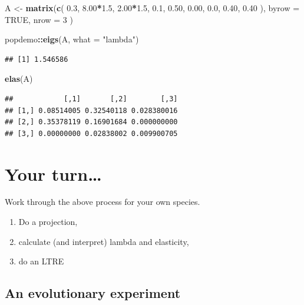 \documentclass[
  a4paper]{book}
\newenvironment{Shaded}{\begin{snugshade}}{\end{snugshade}}
\newcommand{\AttributeTok}[1]{\textcolor[rgb]{0.13,0.29,0.53}{#1}}
\newcommand{\ConstantTok}[1]{\textcolor[rgb]{0.56,0.35,0.01}{#1}}
\newcommand{\DecValTok}[1]{\textcolor[rgb]{0.00,0.00,0.81}{#1}}
\newcommand{\FloatTok}[1]{\textcolor[rgb]{0.00,0.00,0.81}{#1}}
\newcommand{\FunctionTok}[1]{\textcolor[rgb]{0.13,0.29,0.53}{\textbf{#1}}}
\newcommand{\NormalTok}[1]{#1}
\newcommand{\OtherTok}[1]{\textcolor[rgb]{0.56,0.35,0.01}{#1}}
\newcommand{\SpecialCharTok}[1]{\textcolor[rgb]{0.81,0.36,0.00}{\textbf{#1}}}
\newcommand{\StringTok}[1]{\textcolor[rgb]{0.31,0.60,0.02}{#1}}
\providecommand{\tightlist}{%
  \setlength{\itemsep}{0pt}\setlength{\parskip}{0pt}}
\begin{document}
\begin{Shaded}
\begin{Highlighting}[]
\NormalTok{A }\OtherTok{\textless{}{-}} \FunctionTok{matrix}\NormalTok{(}\FunctionTok{c}\NormalTok{(}
  \FloatTok{0.3}\NormalTok{, }\FloatTok{8.00}\SpecialCharTok{*}\FloatTok{1.5}\NormalTok{, }\FloatTok{2.00}\SpecialCharTok{*}\FloatTok{1.5}\NormalTok{,}
  \FloatTok{0.1}\NormalTok{, }\FloatTok{0.50}\NormalTok{, }\FloatTok{0.00}\NormalTok{,}
  \FloatTok{0.0}\NormalTok{, }\FloatTok{0.40}\NormalTok{, }\FloatTok{0.40}
\NormalTok{),}
\AttributeTok{byrow =} \ConstantTok{TRUE}\NormalTok{, }\AttributeTok{nrow =} \DecValTok{3}
\NormalTok{)}

\NormalTok{popdemo}\SpecialCharTok{::}\FunctionTok{eigs}\NormalTok{(A, }\AttributeTok{what =} \StringTok{"lambda"}\NormalTok{)}
\end{Highlighting}
\end{Shaded}

\begin{verbatim}
## [1] 1.546586
\end{verbatim}

\begin{Shaded}
\begin{Highlighting}[]
\FunctionTok{elas}\NormalTok{(A)}
\end{Highlighting}
\end{Shaded}

\begin{verbatim}
##            [,1]       [,2]        [,3]
## [1,] 0.08514005 0.32540118 0.028380016
## [2,] 0.35378119 0.16901684 0.000000000
## [3,] 0.00000000 0.02838002 0.009900705
\end{verbatim}

\section{Your turn\ldots{}}\label{your-turn}

Work through the above process for your own species.

\begin{enumerate}
\def\labelenumi{(\arabic{enumi})}
\tightlist
\item
  Do a projection,
\item
  calculate (and interpret) lambda and elasticity,
\item
  do an LTRE
\end{enumerate}

\subsection{An evolutionary experiment}\label{an-evolutionary-experiment}
\end{document}

